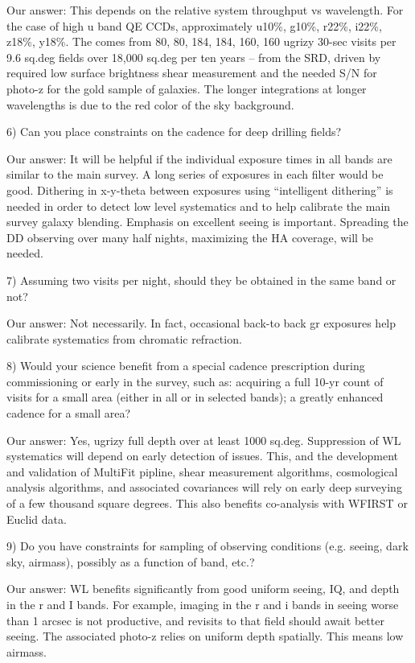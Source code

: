 Our answer: This depends on the relative system throughput vs wavelength. For the case of high u band QE CCDs, approximately u10\%, g10\%, r22\%, i22\%, z18\%, y18\%. The comes from 80, 80, 184, 184, 160, 160 ugrizy 30-sec visits per 9.6 sq.deg fields over 18,000 sq.deg per ten years -- from the SRD, driven by required low surface brightness shear measurement and the needed S/N for photo-z for the gold sample of galaxies. The longer integrations at longer wavelengths is due to the red color of the sky background.

6) Can you place constraints on the cadence for deep drilling fields?

Our answer: It will be helpful if the individual exposure times in all bands are similar to the main survey. A long series of exposures in each filter would be good. Dithering in x-y-theta between exposures using “intelligent dithering” is needed in order to detect low level systematics and to help calibrate the main survey galaxy blending. Emphasis on excellent seeing is important. Spreading the DD observing over many half nights, maximizing the HA coverage, will be needed.

7) Assuming two visits per night, should they be obtained in the same band or not?

Our answer: Not necessarily. In fact, occasional back-to back gr exposures help calibrate systematics from chromatic refraction.

8) Would your science benefit from a special cadence prescription during commissioning or 
early in the survey, such as: acquiring a full 10-yr count of visits for a small area (either in all or in selected bands); a greatly enhanced cadence for a small area?

Our answer: Yes, ugrizy full depth over at least 1000 sq.deg. Suppression of WL systematics will depend on early detection of issues. This, and the development and validation of MultiFit pipline, shear measurement algorithms, cosmological analysis algorithms, and associated covariances will rely on early deep surveying of a few thousand square degrees. This also benefits co-analysis with WFIRST or Euclid data.

9) Do you have constraints for sampling of observing conditions (e.g. seeing, dark sky,
airmass), possibly as a function of band, etc.?

Our answer: WL benefits significantly from good uniform seeing, IQ, and depth in the r and I bands. For example, imaging in the r and i bands in seeing worse than 1 arcsec is not productive, and revisits to that field should await better seeing. The associated photo-z relies on uniform depth spatially. This means low airmass.

